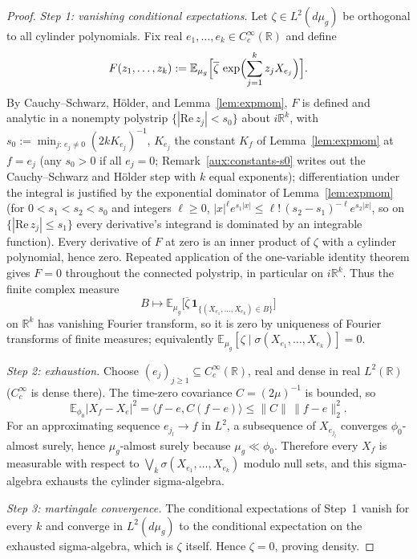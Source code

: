 \documentclass[11pt,a4paper]{article}
\theoremstyle{plain}
\theoremstyle{definition}
\theoremstyle{plain}
\theoremstyle{definition}
\newcommand{\R}{\mathbb{R}}
\newcommand{\E}{\mathbb{E}}
\newcommand{\ip}[2]{\langle #1,#2\rangle}
\begin{document}
\begin{proof}
\emph{Step 1: vanishing conditional expectations.} Let $\zeta\in L^2(d\mu_g)$ be orthogonal
to all cylinder polynomials. Fix real $e_1,\dots,e_k\in C_c^\infty(\R)$ and
define
\[
 F(z_1,\dots,z_k):=
 \E_{\mu_g}\Bigl[\overline\zeta\,\exp\Bigl(\sum_{j=1}^kz_jX_{e_j}\Bigr)\Bigr] .
\]
By Cauchy--Schwarz, H\"older, and Lemma~\ref{lem:expmom}, $F$ is defined and analytic in a
nonempty polystrip $\{|\mathrm{Re}\,z_j|<s_0\}$ about $i\R^k$, with
$s_0:=\min_{j:\,e_j\ne0}(2kK_{e_j})^{-1}$, $K_{e_j}$ the constant $K_f$ of
Lemma~\ref{lem:expmom} at $f=e_j$ (any $s_0>0$ if all $e_j=0$; Remark~\ref{aux:constants-s0}
writes out the Cauchy--Schwarz and H\"older step with $k$ equal exponents);
differentiation under the integral is justified by the exponential dominator of
Lemma~\ref{lem:expmom} (for $0<s_1<s_2<s_0$ and integers $\ell\ge0$,
$|x|^\ell e^{s_1|x|}\le\ell!\,(s_2-s_1)^{-\ell}e^{s_2|x|}$, so on $\{|\mathrm{Re}\,z_j|\le
s_1\}$ every derivative's integrand is dominated by an integrable function). Every
derivative of $F$ at zero is an inner product of $\zeta$ with a cylinder polynomial, hence
zero. Repeated application of the one-variable identity theorem gives $F=0$ throughout the
connected polystrip, in particular on $i\R^k$. Thus the finite complex measure
\[
 B\longmapsto\E_{\mu_g}\bigl[\overline\zeta\,
 \mathbf 1_{\{(X_{e_1},\dots,X_{e_k})\in B\}}\bigr]
\]
on $\R^k$ has vanishing Fourier transform, so it is zero by uniqueness of Fourier
transforms of finite measures; equivalently
$\E_{\mu_g}[\zeta\mid\sigma(X_{e_1},\dots,X_{e_k})]=0$.

\emph{Step 2: exhaustion.} Choose $(e_j)_{j\ge1}\subseteq C_c^\infty(\R)$, real and
dense in real $L^2(\R)$ ($C_c^\infty$ is dense there). The time-zero
covariance $C=(2\mu)^{-1}$ is bounded, so
\[
 \E_{\phi_0}|X_f-X_e|^2=\ip{f-e}{C(f-e)}\le\|C\|\,\|f-e\|_2^2 .
\]
For an approximating sequence $e_{j_l}\to f$ in $L^2$, a subsequence of $X_{e_{j_l}}$
converges $\phi_0$-almost surely, hence $\mu_g$-almost surely because
$\mu_g\ll\phi_0$. Therefore every $X_f$ is measurable with respect to
$\bigvee_k\sigma(X_{e_1},\dots,X_{e_k})$ modulo null sets, and this sigma-algebra exhausts
the cylinder sigma-algebra.

\emph{Step 3: martingale convergence.} The conditional expectations of Step~1 vanish for
every $k$ and converge in $L^2(d\mu_g)$ to the conditional expectation on the exhausted
sigma-algebra, which is $\zeta$ itself. Hence $\zeta=0$, proving density.
\end{proof}
\end{document}
